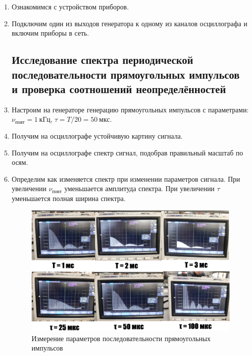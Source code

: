 \documentclass[14pt, a4paper]{report}
\begin{document}
\begin{enumerate}

\setcounter{enumi}{0}

\item Ознакомимся с устройством приборов.

\item Подключим один из выходов генератора к одному из каналов осциллографа и включим приборы в сеть.

\subsection{Исследование спектра периодической последовательности прямоугольных импульсов и проверка соотношений неопределённостей}

\item Настроим на генераторе генерацию прямоугольных импульсов с параметрами: $\nu_{повт}=1\ кГц$, $\tau=T/20=50\ мкс$.

\item Получим на осциллографе устойчивую картину сигнала.

\item Получим на осциллографе спектр сигнал, подобрав правильный масштаб по осям.

\item Определим как изменяется спектр при изменении параметров сигнала. При увеличении $\nu_{повт}$ уменьшается амплитуда спектра. При увеличении $\tau$ уменьшается полная ширина спектра.

\begin{figure}[H]
\centering
\includegraphics[scale=0.3]{images/361_1.png}
\caption{Измерение параметров последовательности прямоугольных импульсов}
\end{figure}


\end{enumerate}
\end{document}
